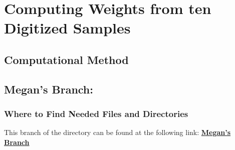 \documentclass{article}
\begin{document}
\section{Computing Weights from ten Digitized Samples} 

\subsection{Computational Method} 



\subsection{Megan's Branch:}
\subsubsection{Where to Find Needed Files and Directories} 
This branch of the directory can be found at the following link:
\href{https://github.com/atishelmanch/ECAL_Weights/tree/Megan}{\bf{Megan's Branch}}\\

\end{document}
